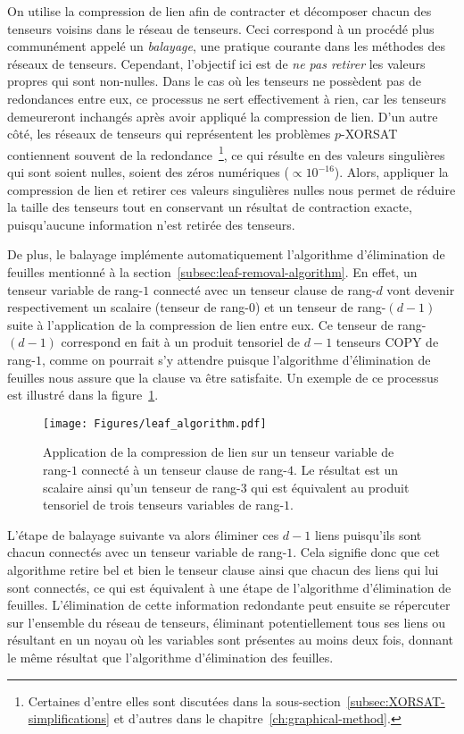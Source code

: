On utilise la compression de lien afin de contracter et décomposer chacun des tenseurs voisins dans le réseau de tenseurs.
Ceci correspond à un procédé plus communément appelé un \emph{balayage}, une pratique courante dans les méthodes des réseaux de tenseurs.
Cependant, l'objectif ici est de \emph{ne pas retirer} les valeurs propres qui sont non-nulles.
Dans le cas où les tenseurs ne possèdent pas de redondances entre eux, ce processus ne sert effectivement à rien, car les tenseurs demeureront inchangés après avoir appliqué la compression de lien.
D'un autre côté, les réseaux de tenseurs qui représentent les problèmes $p$-XORSAT contiennent souvent de la redondance~\footnote{Certaines d'entre elles sont discutées dans la sous-section~\ref{subsec:XORSAT-simplifications} et d'autres dans le chapitre~\ref{ch:graphical-method}.}, ce qui résulte en des valeurs singulières qui sont soient nulles, soient des zéros numériques ($\propto 10^{-16}$).
Alors, appliquer la compression de lien et retirer ces valeurs singulières nulles nous permet de réduire la taille des tenseurs tout en conservant un résultat de contraction exacte, puisqu'aucune information n'est retirée des tenseurs.

De plus, le balayage implémente automatiquement l'algorithme d'élimination de feuilles mentionné à la section~\ref{subsec:leaf-removal-algorithm}.
En effet, un tenseur variable de rang-$1$ connecté avec un tenseur clause de rang-$d$ vont devenir respectivement un scalaire (tenseur de rang-$0$) et un tenseur de rang-$(d - 1)$ suite à l'application de la compression de lien entre eux.
Ce tenseur de rang-$(d - 1)$ correspond en fait à un produit tensoriel de $d - 1$ tenseurs COPY de rang-$1$, comme on pourrait s'y attendre puisque l'algorithme d'élimination de feuilles nous assure que la clause va être satisfaite.
Un exemple de ce processus est illustré dans la figure~\ref{fig:degree1_sweep}.
\begin{figure}[h]
    \centering
    \texttt{[image: Figures/leaf\_algorithm.pdf]}
    \caption{Application de la compression de lien sur un tenseur variable de rang-$1$ connecté à un tenseur clause de rang-$4$. Le résultat est un scalaire ainsi qu'un tenseur de rang-$3$ qui est équivalent au produit tensoriel de trois tenseurs variables de rang-$1$.}
    \label{fig:degree1_sweep}
\end{figure}
L'étape de balayage suivante va alors éliminer ces $d - 1$ liens puisqu'ils sont chacun connectés avec un tenseur variable de rang-$1$.
Cela signifie donc que cet algorithme retire bel et bien le tenseur clause ainsi que chacun des liens qui lui sont connectés, ce qui est équivalent à une étape de l'algorithme d'élimination de feuilles.
L'élimination de cette information redondante peut ensuite se répercuter sur l'ensemble du réseau de tenseurs, éliminant potentiellement tous ses liens ou résultant en un noyau où les variables sont présentes au moins deux fois, donnant le même résultat que l'algorithme d'élimination des feuilles.




